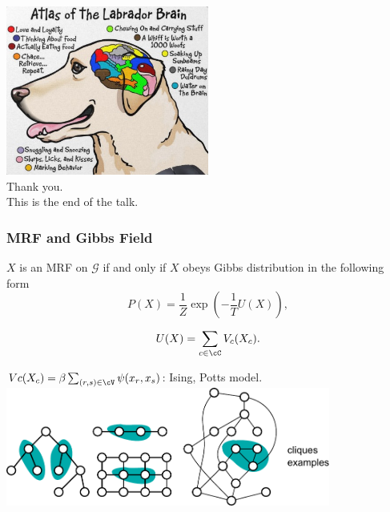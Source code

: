 \documentclass[sansserif, 10pt]{beamer}
\begin{document}
\begin{frame}
  \centering
  \includegraphics[width=0.5\textwidth]{sfig/dog_brain}\\
  \vspace{10pt}  
  Thank you.\\
  This is the end of the talk.
\end{frame}



\begin{frame}
\frametitle{MRF and Gibbs Field}

\begin{theorem}
  $X$ is an MRF on $\mathcal{G}$ if and only if $X$ obeys Gibbs distribution in
  the following form
  \begin{equation*}
    P(X) = \frac{1}{Z}\exp \left( -\frac{1}{T} U(X) \right),
  \end{equation*}

  \begin{equation*}
    U(X) = \sum_{c\in \cC} V_c(X_c).
  \end{equation*}
\end{theorem}

$Vc(X_c) = \beta \sum_{(r,s) \in \cV} \psi(x_r, x_s) $: Ising, Potts model.
\centering
\includegraphics[width = 0.8\textwidth]{sfig/clique_examples}

\end{frame}
\end{document}
